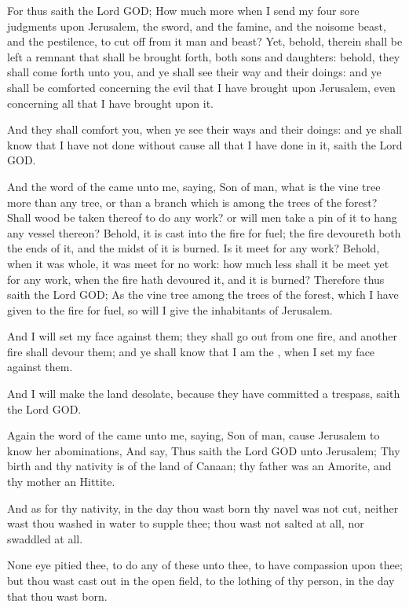 \Verse For thus saith the Lord GOD; How much more when I send my four sore judgments upon Jerusalem, the sword, and the famine, and the noisome beast, and the pestilence, to cut off from it man and beast?  \Verse Yet, behold, therein shall be left a remnant that shall be brought forth, both sons and daughters: behold, they shall come forth unto you, and ye shall see their way and their doings: and ye shall be comforted concerning the evil that I have brought upon Jerusalem, even concerning all that I have brought upon it.

\Verse And they shall comfort you, when ye see their ways and their doings: and ye shall know that I have not done without cause all that I have done in it, saith the Lord GOD.


\Chapter
\Verse And the word of the \LORD came unto me, saying, \Verse Son of man, what is the vine tree more than any tree, or than a branch which is among the trees of the forest?  \Verse Shall wood be taken thereof to do any work? or will men take a pin of it to hang any vessel thereon?  \Verse Behold, it is cast into the fire for fuel; the fire devoureth both the ends of it, and the midst of it is burned. Is it meet for any work?  \Verse Behold, when it was whole, it was meet for no work: how much less shall it be meet yet for any work, when the fire hath devoured it, and it is burned?  \Verse Therefore thus saith the Lord GOD; As the vine tree among the trees of the forest, which I have given to the fire for fuel, so will I give the inhabitants of Jerusalem.

\Verse And I will set my face against them; they shall go out from one fire, and another fire shall devour them; and ye shall know that I am the \LORD, when I set my face against them.

\Verse And I will make the land desolate, because they have committed a trespass, saith the Lord GOD.


\Chapter
\Verse Again the word of the \LORD came unto me, saying, \Verse Son of man, cause Jerusalem to know her abominations, \Verse And say, Thus saith the Lord GOD unto Jerusalem; Thy birth and thy nativity is of the land of Canaan; thy father was an Amorite, and thy mother an Hittite.

\Verse And as for thy nativity, in the day thou wast born thy navel was not cut, neither wast thou washed in water to supple thee; thou wast not salted at all, nor swaddled at all.

\Verse None eye pitied thee, to do any of these unto thee, to have compassion upon thee; but thou wast cast out in the open field, to the lothing of thy person, in the day that thou wast born.

